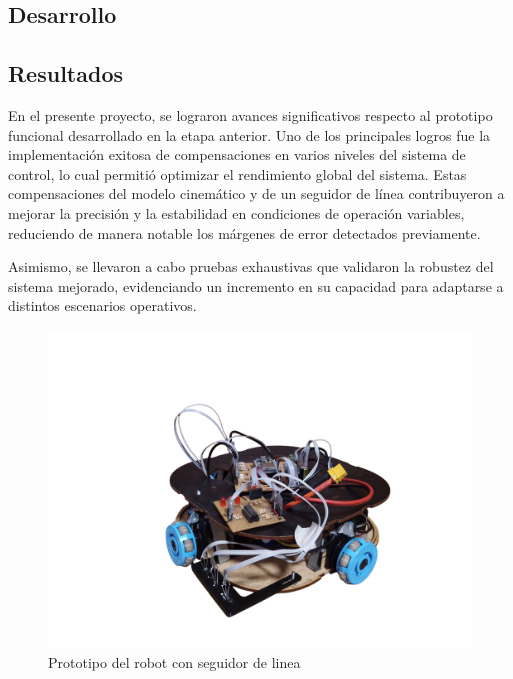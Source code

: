 \subsection{Desarrollo}







\subsection{Resultados}

En el presente proyecto, se lograron avances significativos respecto al prototipo funcional desarrollado en la etapa anterior. Uno de los principales logros fue la implementación exitosa de compensaciones en varios niveles del sistema de control, lo cual permitió optimizar el rendimiento global del sistema. Estas compensaciones del modelo cinemático y de un seguidor de línea contribuyeron a mejorar la precisión y la estabilidad en condiciones de operación variables, reduciendo de manera notable los márgenes de error detectados previamente.

Asimismo, se llevaron a cabo pruebas exhaustivas que validaron la robustez del sistema mejorado, evidenciando un incremento en su capacidad para adaptarse a distintos escenarios operativos.

\begin{figure}[H]
    \centering
    \includegraphics[trim={0 2cm 0 7.5cm}, clip, width=1.1\linewidth]{images/prototipo_robot_con_sens_mag.png}
    \caption{Prototipo del robot con seguidor de linea}
    \label{fig:prototiporobotlinef}
\end{figure}

